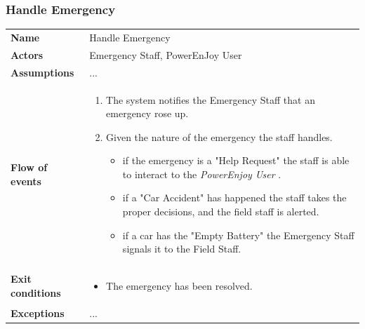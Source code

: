 \documentclass[english]{article}
\newcommand{\powerenjoyuser}{\textit{PowerEnjoy User }}
\begin{document}
\subsubsection{Handle Emergency}
	\begin{center}
	\begin{tabular}{l||p{10cm}}
	\textbf{Name} 
		& Handle Emergency\\ [8px]
	\textbf{Actors} 
		& Emergency Staff, PowerEnJoy User\\ [8px]
	\textbf{Assumptions} 
		&...\\[8px]
	\textbf{Flow of events}
		& \begin{enumerate}
			\item The system notifies the Emergency Staff that an emergency rose up.
			\item Given the nature of the emergency the staff handles.
				\begin{itemize}
					\item if the emergency is a "Help Request" the staff is able to interact to the \powerenjoyuser.
					\item if a "Car Accident" has happened the staff takes the proper decisions, and the field staff is alerted.
					\item if a car has the "Empty Battery" the Emergency Staff signals it to the Field Staff.
			\end{itemize} 
		\end{enumerate}\\ 
	\textbf{Exit conditions}
		&\begin{itemize}
			\item The emergency has been resolved.
		\end{itemize}\\
	\textbf{Exceptions}
		&...\\[8px]
	\end{tabular}
	\end{center}
\end{document}
